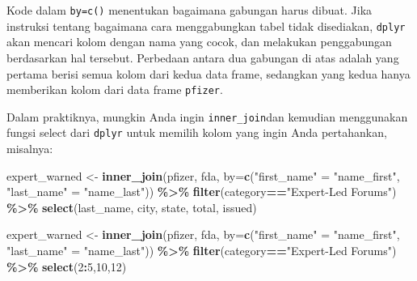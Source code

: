 \documentclass[
]{book}
\newenvironment{Shaded}{\begin{snugshade}}{\end{snugshade}}
\newcommand{\AttributeTok}[1]{\textcolor[rgb]{0.13,0.29,0.53}{#1}}
\newcommand{\DecValTok}[1]{\textcolor[rgb]{0.00,0.00,0.81}{#1}}
\newcommand{\FunctionTok}[1]{\textcolor[rgb]{0.13,0.29,0.53}{\textbf{#1}}}
\newcommand{\NormalTok}[1]{#1}
\newcommand{\OtherTok}[1]{\textcolor[rgb]{0.56,0.35,0.01}{#1}}
\newcommand{\SpecialCharTok}[1]{\textcolor[rgb]{0.81,0.36,0.00}{\textbf{#1}}}
\newcommand{\StringTok}[1]{\textcolor[rgb]{0.31,0.60,0.02}{#1}}
\begin{document}
Kode dalam \texttt{by=c()} menentukan bagaimana gabungan harus dibuat. Jika instruksi tentang bagaimana cara menggabungkan tabel tidak disediakan, \texttt{dplyr} akan mencari kolom dengan nama yang cocok, dan melakukan penggabungan berdasarkan hal tersebut. Perbedaan antara dua gabungan di atas adalah yang pertama berisi semua kolom dari kedua data frame, sedangkan yang kedua hanya memberikan kolom dari data frame \texttt{pfizer}.

Dalam praktiknya, mungkin Anda ingin \texttt{inner\_join}dan kemudian menggunakan fungsi select dari \texttt{dplyr} untuk memilih kolom yang ingin Anda pertahankan, misalnya:

\begin{Shaded}
\begin{Highlighting}[]
\NormalTok{expert\_warned }\OtherTok{\textless{}{-}} \FunctionTok{inner\_join}\NormalTok{(pfizer, fda, }
                            \AttributeTok{by=}\FunctionTok{c}\NormalTok{(}\StringTok{"first\_name"} \OtherTok{=} \StringTok{"name\_first"}\NormalTok{, }
                                 \StringTok{"last\_name"} \OtherTok{=} \StringTok{"name\_last"}\NormalTok{)) }\SpecialCharTok{\%\textgreater{}\%}
                            \FunctionTok{filter}\NormalTok{(category}\SpecialCharTok{==}\StringTok{"Expert{-}Led Forums"}\NormalTok{) }\SpecialCharTok{\%\textgreater{}\%}
                            \FunctionTok{select}\NormalTok{(last\_name, }
\NormalTok{                                   city, }
\NormalTok{                                   state, }
\NormalTok{                                   total, }
\NormalTok{                                   issued)}

\NormalTok{expert\_warned }\OtherTok{\textless{}{-}} \FunctionTok{inner\_join}\NormalTok{(pfizer, fda, }
                            \AttributeTok{by=}\FunctionTok{c}\NormalTok{(}\StringTok{"first\_name"} \OtherTok{=} \StringTok{"name\_first"}\NormalTok{,}
                                 \StringTok{"last\_name"} \OtherTok{=} \StringTok{"name\_last"}\NormalTok{)) }\SpecialCharTok{\%\textgreater{}\%}
                            \FunctionTok{filter}\NormalTok{(category}\SpecialCharTok{==}\StringTok{"Expert{-}Led Forums"}\NormalTok{) }\SpecialCharTok{\%\textgreater{}\%}
                            \FunctionTok{select}\NormalTok{(}\DecValTok{2}\SpecialCharTok{:}\DecValTok{5}\NormalTok{,}\DecValTok{10}\NormalTok{,}\DecValTok{12}\NormalTok{)}
\end{Highlighting}
\end{Shaded}
\end{document}
